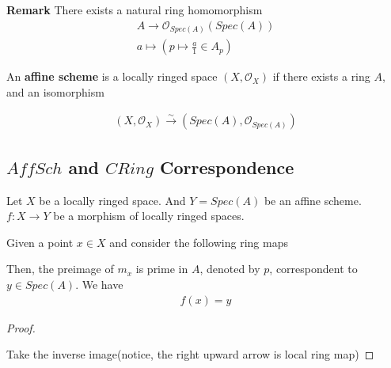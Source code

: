 \documentclass[Total.tex]{subfiles}
\begin{document}
			\textbf{Remark} There exists a natural ring homomorphism
			\begin{gather*}
				A\rightarrow \mathcal{O}_{Spec(A)}(Spec(A))\\
				a\mapsto (p\mapsto \frac{a}{1}\in A_p)
			\end{gather*}
			
			\begin{Def}
				An \textbf{affine scheme} is a locally ringed space $(X,\mathcal{O}_X)$ if there exists a ring $A$, and an isomorphism 
				
				\begin{gather*}
					(X,\mathcal{O}_X)\stackrel{\sim}{\rightarrow} (Spec(A),\mathcal{O}_{Spec(A)})
				\end{gather*}
			\end{Def}
			\subsection{$AffSch$ and $CRing$ Correspondence}
		
			\begin{lemma}
				\label{algebraic-geometry-morphism-of-stalks-of-locally-ringed-spaces}Let $X$ be a locally ringed space. And $Y=Spec(A)$ be an affine scheme. $f:X\rightarrow Y$ be a morphism of locally ringed spaces.
				
				Given a point $x\in X$ and consider the following ring maps
				\begin{center}
				\end{center}
				Then, the preimage of $m_x$ is prime in $A$, denoted by $p$, correspondent to $y\in Spec(A)$. We have
				\begin{gather*}
					f(x)=y
				\end{gather*}
			\end{lemma}
			
			\begin{proof}
				\begin{center}
				\end{center}
				
				Take the inverse image(notice, the right upward arrow is local ring map)
			\end{proof}
			
\end{document}

